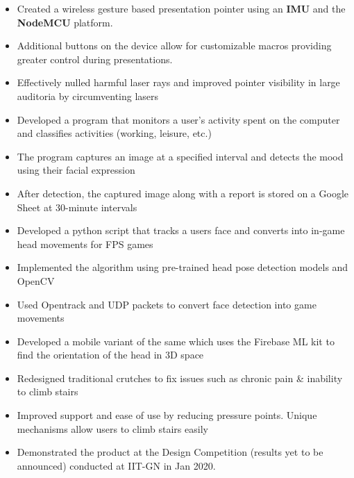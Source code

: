 

    \begin{itemize}
        \item Created a wireless gesture based presentation pointer using an \textbf{IMU} and the \textbf{NodeMCU} platform.
        \item Additional buttons on the device allow for customizable macros providing greater control during presentations.
        \item Effectively nulled harmful laser rays and improved pointer visibility in large auditoria by circumventing lasers
    \end{itemize}

\divider


    \begin{itemize}
    \item Developed a program that monitors a user's activity spent on the computer and classifies activities (working, leisure, etc.)
    \item The program captures an image at a specified interval and detects the mood using their facial expression
    \item After detection, the captured image along with a report is stored on a Google Sheet at 30-minute intervals
\end{itemize}


\divider

    \begin{itemize}
        \item Developed a python script that tracks a users face and converts into in-game head movements for FPS games
        \item Implemented the algorithm using pre-trained head pose detection models and OpenCV
        \item Used Opentrack and UDP packets to convert face detection into game movements
        \item Developed a mobile variant of the same which uses the Firebase ML kit to find the orientation of the head in 3D space
    \end{itemize}

\divider


    \begin{itemize}
        \item Redesigned traditional crutches to fix issues such as chronic pain \& inability to climb stairs
        \item Improved support and ease of use by reducing pressure points. Unique mechanisms allow users to climb stairs easily
        \item Demonstrated the product at the Design Competition (results yet to be announced) conducted at IIT-GN in Jan 2020.
    \end{itemize}
    
